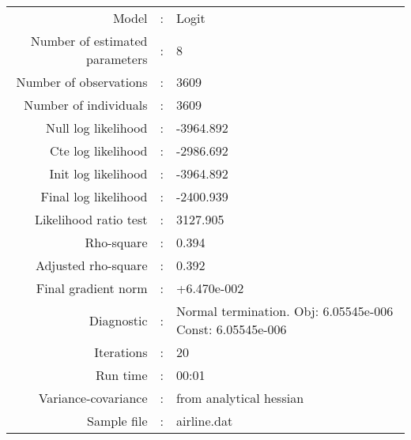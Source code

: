 

\begin{flushleft}
\begin{tabular}{rcl}
\hline
Model &:& Logit\\
Number of estimated parameters&:&8\\
Number of  observations &:& 3609\\
Number of individuals&:&3609\\
Null log likelihood&:&-3964.892\\
Cte log likelihood&:&-2986.692\\
Init log likelihood&:&-3964.892\\
Final log likelihood&:&-2400.939\\
Likelihood ratio test &:&3127.905\\
Rho-square&:&0.394\\
Adjusted rho-square&:&0.392\\
Final gradient norm&:&+6.470e-002\\
Diagnostic&:&Normal termination. Obj: 6.05545e-006 Const: 6.05545e-006\\
Iterations&:&20\\
Run time&:&00:01\\
Variance-covariance&:&from analytical hessian
\\
Sample file&:&airline.dat\\
\end{tabular}
\end{flushleft}
